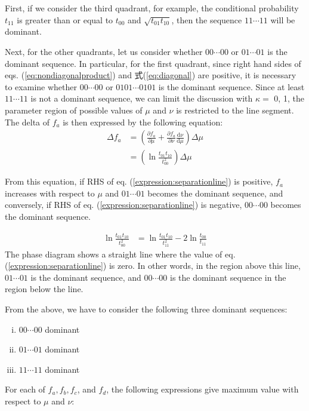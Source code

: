 ﻿\documentclass[a4paper,xelatex,english]{bxjsarticle}
\begin{document}
First, if we consider the third quadrant, for example, the conditional probability $t_{11}$ is greater than or equal to $t_{00}$ and $\sqrt{t_{01}t_{10}}$, then the sequence $11 \cdots 11$ will be dominant.

Next, for the other quadrants, let us consider whether $00 \cdots 00$ or $01 \cdots 01$ is the dominant sequence. 
In particular, for the first quadrant, since right hand sides of eqs. (\ref{eq:nondiagonalproduct}) and 式(\ref{eq:diagonal}) are positive, it is necessary to examine whether $00 \cdots 00$ or $0101 \cdots 0101$ is the dominant sequence. 
Since at least $11 \cdots 11$ is not a dominant sequence, we can limit the discussion with $\kappa =$ 0, 1, the parameter region of possible values of $\mu$ and $\nu$ is restricted to the line segment. 
The delta of $f_{a}$ is then expressed by the following equation:
\begin{align}
\Delta f_{a} 
&= 
\left( 
\frac{\partial f_{a}}{\partial \mu} 
+ 
\frac{\partial f_{a}}{\partial \nu} 
\frac{{\mathrm d} \nu}{{\mathrm d} \mu}
\right) 
\Delta \mu 
\nonumber 
\\
&= 
\left(
\ln \frac{t_{01}t_{10}}{t_{00}^{2}}
\right)
\Delta \mu
\end{align}

From this equation, if RHS of eq. (\ref{expression:separationline}) is positive, $f_{a}$ increases with respect to $\mu$ and $01 \cdots 01$ becomes the dominant sequence, and conversely, if RHS of eq. (\ref{expression:separationline}) is negative, $00 \cdots 00$ becomes the dominant sequence.

\begin{align}
	\ln \frac{t_{01}t_{10}}{t_{00}^{2}} 
	&= 
	\ln \frac{t_{01}t_{10}}{t_{11}^{2}} - 2 \ln \frac{t_{00}}{t_{11}}
	\label{expression:separationline}
\end{align}
The phase diagram shows a straight line where the value of eq. (\ref{expression:separationline}) is zero.  
In other words, in the region above this line, $01 \cdots 01$ is the dominant sequence, and $00 \cdots 00$ is the dominant sequence in the region below the line. 


From the above, we have to consider the following three dominant sequences:
\begin{enumerate}[i)]
	\item $00 \cdots 00$ dominant 
	\item $01 \cdots 01$ dominant 
	\item $11 \cdots 11$ dominant 
\end{enumerate}
For each of $f_a, f_b, f_c$, and $f_d$, the following expressions give maximum value with respect to $\mu$ and $\nu$:
\end{document}
